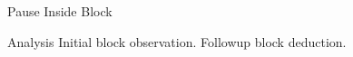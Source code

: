 \documentclass[14pt,t]{beamer}
\begin{document}
\begin{frame}{Pause Inside Block}
\begin{block}{Analysis}
Initial block observation.
\pause
Followup block deduction.
\end{block}
\end{frame}
\end{document}

